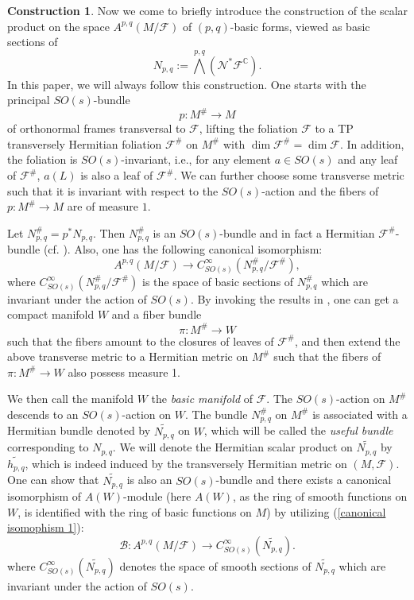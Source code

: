 \documentclass[12pt]{amsart}
\numberwithin{equation}{section}
\theoremstyle{definition}
\theoremstyle{definition}
\newtheorem{Construction}  [theorem]     {Construction}
\theoremstyle{definition}
\renewcommand{\1}{\mathsf{1}}
\renewcommand{\>}{\rightarrow}
\def\mb{\mathbb}
\def\mc{\mathcal}
\theoremstyle{plain} %
\theoremstyle{plain} %
\theoremstyle{plain} %
\begin{document}
	\begin{Construction}\label{CONSTRUCTION}
		Now we come to briefly introduce the construction of the scalar product on the space  $A^{p,q}(M/\mc F)$ of $(p,q)$-basic forms, viewed as basic sections of $$N_{p,q}:=\bigwedge^{p,q}(\mc N^*\mc F^\mb C).$$  In this paper,  we will always follow this construction.   One starts with the principal $SO(s)$-bundle $$p: {M}^{\#} \longrightarrow M$$ of orthonormal frames transversal to $\mc F$, lifting the foliation ${\mc F}$ to a TP transversely Hermitian foliation ${\mc F}^{\#}$ on ${M}^{\#}$ with $\dim {\mathcal F}^{\#}=\dim \mc F.$
		In addition, the foliation is  $SO(s)$-invariant, i.e., for any element $a\in SO(s)$ and any leaf of $\mc F^{\#}$, $a(L)$ is also a leaf of $\mc F^\#$. We can further choose some transverse metric such that it is invariant with respect to the $SO(s)$-action and the fibers of  $p: {M}^{\#} \rightarrow M$  are of measure $1$.
		
		Let $N_{p,q}^{\#}=p^* N_{p,q}$. Then $N_{p,q}^{\#}$ is an $SO(s)$-bundle and in fact a Hermitian $\mc F^{\#}$-bundle (cf. \cite[Definition 2.5.2]{EKA90}). Also, one has the following canonical isomorphism:
		\begin{equation}\label{canonical isomophism 1}
			A^{p,q}(M/\mc F)\longrightarrow C^\infty _{SO(s)}(N_{p,q}^{\#}/\mc F^{\#}),
		\end{equation}
		where $C^\infty _{SO(s)}(N_{p,q}^{\#}/\mc F^{\#})$ is the space of  basic sections of $N_{p,q}^{\#}$ which are invariant under the action of $SO(s)$.
		By invoking the results in  \cite{Mo82}, one can get a compact manifold $W$ and a fiber bundle $$\pi:{M}^{\#}\longrightarrow W$$ such that the fibers amount to the closures of leaves of ${\mc{F}}^{\#}$, and then extend the above transverse metric to a Hermitian metric on ${M}^{\#}$ such that the fibers of $\pi:{M}^{\#}\rightarrow W$ also possess measure 1. 
        
        We then call the manifold $W$ the \textit{basic manifold} of $\mc F$. The $SO(s)$-action on ${M}^{\#}$ descends to an $SO(s)$-action on $W$.
		The bundle $N_{p,q}^{\#}$ on $M^{\#}$ is associated with a Hermitian bundle denoted by $\widetilde{N_{p,q}}$ on $W$, which will be called the \textit{useful bundle} corresponding to $N_{p,q}$. We will denote the Hermitian scalar product on $\widetilde{N_{p,q}}$ by $\widetilde{h_{p,q}}$, which is indeed induced by the transversely Hermitian metric on $(M,\mc F)$. One can show that  $\widetilde{N_{p,q}}$  is also an $SO(s)$-bundle and  there exists a canonical isomorphism of $A(W)$-module (here $A(W)$, as the ring of smooth functions on $W$, is identified with the ring of basic functions on $M$) by utilizing (\ref{canonical isomophism 1}):
		\begin{equation}\label{!canonical isomophism 2}
			\mathscr{B}: A^{p,q}(M/\mc F)\longrightarrow C^{\infty}_{SO(s)}(\widetilde{N_{p,q}}).
		\end{equation}
		where $C^{\infty}_{SO(s)}(\widetilde{N_{p,q}})$ denotes the space of smooth sections of $\widetilde{N_{p,q}}$ which are invariant under the action of $SO(s)$.
		

\end{Construction}
\end{document}
